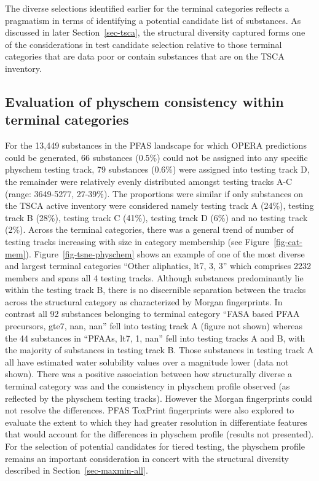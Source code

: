 \documentclass[
  super,
  preprint,
  3p]{elsarticle}
\begin{document}
The diverse selections identified earlier for the terminal categories
reflects a pragmatism in terms of identifying a potential candidate list
of substances. As discussed in later Section~\ref{sec-tsca}, the
structural diversity captured forms one of the considerations in test
candidate selection relative to those terminal categories that are data
poor or contain substances that are on the TSCA inventory.

\hypertarget{evaluation-of-physchem-consistency-within-terminal-categories}{%
\subsection{Evaluation of physchem consistency within terminal
categories}\label{evaluation-of-physchem-consistency-within-terminal-categories}}

For the 13,449 substances in the PFAS landscape for which OPERA
predictions could be generated, 66 substances (0.5\%) could not be
assigned into any specific physchem testing track, 79 substances (0.6\%)
were assigned into testing track D, the remainder were relatively evenly
distributed amongst testing tracks A-C (range: 3649-5277, 27-39\%). The
proportions were similar if only substances on the TSCA active inventory
were considered namely testing track A (24\%), testing track B (28\%),
testing track C (41\%), testing track D (6\%) and no testing track
(2\%). Across the terminal categories, there was a general trend of
number of testing tracks increasing with size in category membership
(see Figure~\ref{fig-cat-mem}). Figure~\ref{fig-tsne-physchem} shows an
example of one of the most diverse and largest terminal categories
``Other aliphatics, lt7, 3, 3'' which comprises 2232 members and spans
all 4 testing tracks. Although substances predominantly lie within the
testing track B, there is no discernible separation between the tracks
across the structural category as characterized by Morgan fingerprints.
In contrast all 92 substances belonging to terminal category ``FASA
based PFAA precursors, gte7, nan, nan'' fell into testing track A
(figure not shown) whereas the 44 substances in ``PFAAs, lt7, 1, nan''
fell into testing tracks A and B, with the majority of substances in
testing track B. Those substances in testing track A all have estimated
water solubility values over a magnitude lower (data not shown). There
was a positive association between how structurally diverse a terminal
category was and the consistency in physchem profile observed (as
reflected by the physchem testing tracks). However the Morgan
fingerprints could not resolve the differences. PFAS ToxPrint
fingerprints were also explored to evaluate the extent to which they had
greater resolution in differentiate features that would account for the
differences in physchem profile (results not presented). For the
selection of potential candidates for tiered testing, the physchem
profile remains an important consideration in concert with the
structural diversity described in Section~\ref{sec-maxmin-all}.
\end{document}
